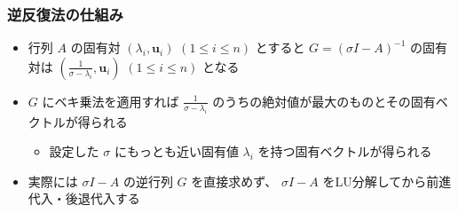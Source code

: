 \documentclass[dvipdfmx,aspectratio=169,20pt]{beamer}
\newcommand{\myfontsetting}[3]{{\fontsize{#1}{#2}\selectfont #3}}
\begin{document}
\begin{frame}
\frametitle{\myfontsetting{28pt}{28pt}{逆反復法の仕組み}}

\begin{itemize}
    \setlength{\itemsep}{0.05cm}
    \item \myfontsetting{15pt}{15pt}{
    行列 $A$ の固有対 $(\lambda_i, \bm{u}_i)$ \myfontsetting{8pt}{8pt}{$(1\le i \le n)$} とすると $G=(\sigma I - A)^{-1}$ の固有対は  $(\frac{1}{\sigma - \lambda_i}, \bm{u}_i)$ \myfontsetting{8pt}{8pt}{$(1\le i \le n)$} となる
    }
    \item \myfontsetting{15pt}{15pt}{
    $G$ にベキ乗法を適用すれば $\frac{1}{\sigma - \lambda_i}$ のうちの絶対値が最大のものとその固有ベクトルが得られる}
    \begin{itemize}
        \item  \myfontsetting{12pt}{12pt}{
        設定した $\sigma$ にもっとも近い固有値 $\lambda_i$ を持つ固有ベクトルが得られる
    }
    \end{itemize}
    \item \myfontsetting{15pt}{15pt}{
    実際には $\sigma I - A$ の逆行列 $G$ を直接求めず、 $\sigma I - A$ をLU分解してから前進代入・後退代入する
    }
\end{itemize}

\end{frame}
\end{document}
